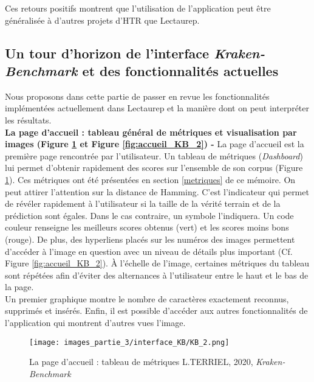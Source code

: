 Ces retours positifs montrent que l'utilisation de l'application peut être généralisée à d'autres projets d'HTR que Lectaurep.\\
\newpage
\subsection{Un tour d'horizon de l'interface \textit{Kraken-Benchmark} et des fonctionnalités actuelles}\label{inter_fonc}
Nous proposons dans cette partie de passer en revue les fonctionnalités implémentées actuellement dans Lectaurep et la manière dont on peut interpréter les résultats.\\

\textbf{La page d'accueil : tableau général de métriques et visualisation par images (Figure \ref{fig:accueil_KB_1} et Figure \ref{fig:accueil_KB_2}) - } La page d'accueil est la première page rencontrée par l'utilisateur. Un tableau de métriques (\textit{Dashboard}) lui permet d'obtenir rapidement des scores sur l'ensemble de son corpus (Figure \ref{fig:accueil_KB_1}). Ces métriques ont été présentées en section \ref{metriques} de ce mémoire. On peut attirer l'attention sur la distance de Hamming. C'est l'indicateur qui permet de révéler rapidement à l'utilisateur si la taille de la vérité terrain et de la prédiction sont égales. Dans le cas contraire, un symbole \inquote{$\emptyset$} l'indiquera. Un code couleur renseigne les meilleurs scores obtenus (vert) et les scores moins bons (rouge). De plus, des hyperliens placés sur les numéros des images permettent d'accéder à l'image en question avec un niveau de détails plus important (Cf. Figure \ref{fig:accueil_KB_2}). 
À l'échelle de l'image, certaines métriques du tableau sont répétées afin d'éviter des alternances à l'utilisateur entre le haut et le bas de la page.\\ Un premier graphique montre le nombre de caractères exactement reconnus, supprimés et insérés. Enfin, il est possible d'accéder aux autres fonctionnalités de l'application qui montrent d'autres vues l'image.
\begin{figure}[H]
    \centering
    \texttt{[image: images\_partie\_3/interface\_KB/KB\_2.png]}
        \caption{La page d'accueil : tableau de métriques \textcopyright L.TERRIEL, 2020, \textit{Kraken-Benchmark}}
        \label{fig:accueil_KB_1}
\end{figure}

